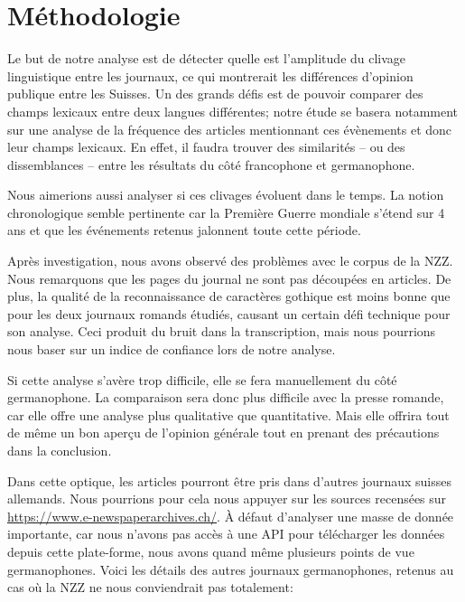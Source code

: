 \documentclass[french,a4paper]{article}
\begin{document}
\section*{Méthodologie}

Le but de notre analyse est de détecter quelle est l'amplitude du clivage linguistique entre les journaux, ce qui montrerait les différences d'opinion publique entre les Suisses.
Un des grands défis est de pouvoir comparer des champs lexicaux entre deux langues différentes; notre étude se basera notamment sur une analyse de la fréquence des articles mentionnant ces évènements et donc leur champs lexicaux.
En effet, il faudra trouver des similarités -- ou des dissemblances -- entre les résultats du côté francophone et germanophone.

Nous aimerions aussi analyser si ces clivages évoluent dans le temps.
La notion chronologique semble pertinente car la Première Guerre mondiale s'étend sur 4 ans et que les événements retenus jalonnent toute cette période.

Après investigation, nous avons observé des problèmes avec le corpus de la NZZ.
Nous remarquons que les pages du journal ne sont pas découpées en articles.
De plus, la qualité de la reconnaissance de caractères gothique est moins bonne que pour les deux journaux romands étudiés, causant un certain défi technique pour son analyse.
Ceci produit du bruit dans la transcription, mais nous pourrions nous baser sur un indice de confiance lors de notre analyse.

Si cette analyse s'avère trop difficile, elle se fera manuellement du côté germanophone.
La comparaison sera donc plus difficile avec la presse romande, car elle offre une analyse plus qualitative que quantitative.
Mais elle offrira tout de même un bon aperçu de l'opinion générale tout en prenant des précautions dans la conclusion.

Dans cette optique, les articles pourront être pris dans d'autres journaux suisses allemands.
Nous pourrions pour cela nous appuyer sur les sources recensées sur \url{https://www.e-newspaperarchives.ch/}.
À défaut d'analyser une masse de donnée importante, car nous n'avons pas accès à une API pour télécharger les données depuis cette plate-forme, nous avons quand même plusieurs points de vue germanophones.
Voici les détails des autres journaux germanophones, retenus au cas où la NZZ ne nous conviendrait pas totalement:
\end{document}
